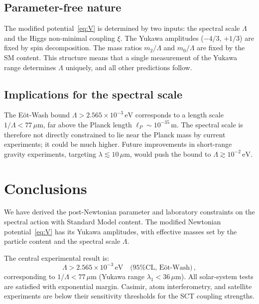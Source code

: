 \documentclass[aps,prd,twocolumn,superscriptaddress,nofootinbib,floatfix]{revtex4-2}
\begin{document}
\subsection{Parameter-free nature}

The modified potential~\eqref{eq:V} is determined by two inputs:
the spectral scale $\Lambda$ and the Higgs non-minimal coupling $\xi$.
The Yukawa amplitudes ($-4/3$, $+1/3$) are fixed by spin decomposition.
The mass ratios $m_2/\Lambda$ and $m_0/\Lambda$ are fixed by the SM
content. This structure means that a single measurement of
the Yukawa range determines $\Lambda$ uniquely, and all other predictions
follow.

\subsection{Implications for the spectral scale}

The E\"ot-Wash bound $\Lambda > 2.565 \times 10^{-3}\,\mathrm{eV}$
corresponds to a length scale $1/\Lambda < 77\,\mu\mathrm{m}$, far
above the Planck length $\ell_P \sim 10^{-35}\,\mathrm{m}$. The
spectral scale is therefore not directly constrained to lie near the
Planck mass by current experiments; it could be much higher. Future
improvements in short-range gravity experiments, targeting
$\lambda \lesssim 10\,\mu\mathrm{m}$, would push the bound to
$\Lambda \gtrsim 10^{-2}\,\mathrm{eV}$.


\section{Conclusions}
\label{sec:conclusions}

We have derived the post-Newtonian parameter and laboratory constraints
on the spectral action with Standard Model content. The modified
Newtonian potential~\eqref{eq:V} has its Yukawa
amplitudes, with effective masses set by the particle content and the
spectral scale $\Lambda$.

The central experimental result is:
\begin{equation*}
  \Lambda > 2.565 \times 10^{-3}\,\mathrm{eV}
  \quad \text{(95\% CL, E\"ot-Wash)}\,,
\end{equation*}
corresponding to $1/\Lambda < 77\,\mu\mathrm{m}$ (Yukawa range
$\lambda_1 < 36\,\mu\mathrm{m}$). All solar-system tests
are satisfied with exponential margin. Casimir, atom interferometry, and
satellite experiments are below their sensitivity thresholds for the SCT
coupling strengths.
\end{document}
